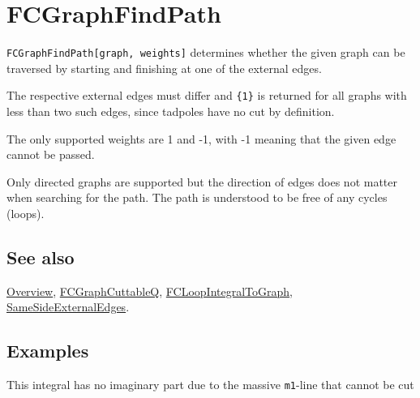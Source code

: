 \documentclass[../FeynCalcManual.tex]{subfiles}
\begin{document}
\hypertarget{fcgraphfindpath}{
\section{FCGraphFindPath}\label{fcgraphfindpath}}

\texttt{FCGraphFindPath[\allowbreak{}graph,\ \allowbreak{}weights]}
determines whether the given graph can be traversed by starting and
finishing at one of the external edges.

The respective external edges must differ and
\texttt{\{\allowbreak{}1\}} is returned for all graphs with less than
two such edges, since tadpoles have no cut by definition.

The only supported weights are 1 and -1, with -1 meaning that the given
edge cannot be passed.

Only directed graphs are supported but the direction of edges does not
matter when searching for the path. The path is understood to be free of
any cycles (loops).

\subsection{See also}

\hyperlink{toc}{Overview},
\hyperlink{fcgraphcuttableq}{FCGraphCuttableQ},
\hyperlink{fcloopintegraltograph}{FCLoopIntegralToGraph},
\hyperlink{samesideexternaledges}{SameSideExternalEdges}.

\subsection{Examples}

This integral has no imaginary part due to the massive \texttt{m1}-line
that cannot be cut

\begin{Shaded}
\begin{Highlighting}[]
\ExtensionTok{=} \OperatorTok{\{}\SpecialCharTok{{-}} \OtherTok{{-}\textgreater{}} \OperatorTok{,} \SpecialCharTok{{-}} \OtherTok{{-}\textgreater{}} \OperatorTok{,}  \OtherTok{{-}\textgreater{}} \OperatorTok{,}  \OtherTok{{-}\textgreater{}} \OperatorTok{,}  \OtherTok{{-}\textgreater{}} \OperatorTok{,}  \OtherTok{{-}\textgreater{}} \OperatorTok{,}  \OtherTok{{-}\textgreater{}} \OperatorTok{,}  \OtherTok{{-}\textgreater{}} \OperatorTok{\}}\NormalTok{;}
\end{Highlighting}
\end{Shaded}
\end{document}
